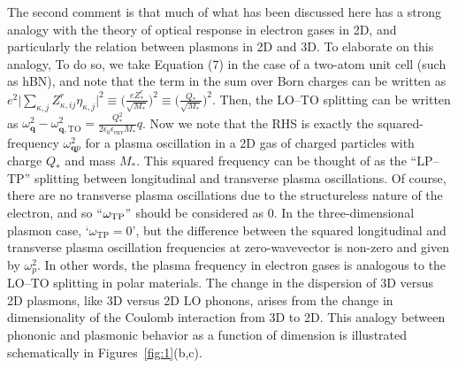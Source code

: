 \documentclass[aps,prb,twocolumn,
	           groupedaddress,superscriptaddress,
               amsfonts,amssymb,amsmath,floatfix,
	           citeautoscript]{revtex4-1}
\makeatletter
\newcommand{\eg}{e.g.\@\xspace}
\newcommand{\comment}[2]{%
    \ifbool{togglecomments}%
    {\textcolor{blue!70!black}{\small\textsf{%
    \textsuperscript{\textsc{\textsf{\MakeLowercase{#1}}}}%
    [#2]}}} %
    {}}     %
\makeatother
\begin{document}
The second comment is that much of what has been discussed here has a strong analogy with the theory of optical response in electron gases in 2D, and particularly the relation between plasmons in 2D and 3D. To elaborate on this analogy, To do so, we take Equation (7) in the case of a two-atom unit cell (such as hBN), and note that the term in the sum over Born charges can be written as $e^2\big|\sum_{\kappa,j}Z^r_{\kappa,ij}\eta_{\kappa,j}  \big|^2 \equiv  \Big(\frac{eZ^r_*}{\sqrt{M_*}}\Big)^2 \equiv \Big(\frac{Q_*}{\sqrt{M_*}}\Big)^2$. Then, the LO--TO splitting can be written as $\omega^2_{\mathbf{q}} - \omega^2_{\mathbf{q},\mathrm{TO}} = \frac{Q_*^2}{2\epsilon_0\epsilon_{\mathrm{env}} M_*}q$. Now we note that the RHS is exactly the squared-frequency $\omega^2_{\mathbf{q}p}$ for a plasma oscillation in a 2D gas of charged particles with charge $Q_*$ and mass $M_*$. This squared frequency can be thought of as the ``LP--TP'' splitting between longitudinal and transverse plasma oscillations. Of course, there are no transverse plasma oscillations due to the structureless nature of the electron, and so ``$\omega_{\mathrm{TP}}"$  should be considered as 0. In the three-dimensional plasmon case, `$\omega_{\mathrm{TP}} = 0$', but the difference between the squared longitudinal and transverse plasma oscillation frequencies at zero-wavevector is non-zero and given by $\omega_p^2$. In other words, the plasma frequency in electron gases is analogous to the LO--TO splitting in polar materials. The change in the dispersion of 3D versus 2D plasmons, like 3D versus 2D LO phonons, arises from the change in dimensionality of the Coulomb interaction from 3D to 2D.  This analogy between phononic and plasmonic behavior as a function of dimension is illustrated schematically in Figures~\ref{fig:1}(b,c).
  
\end{document}
